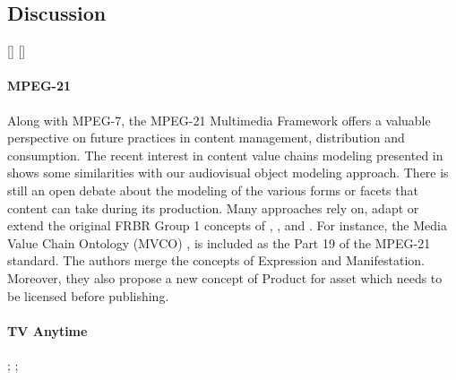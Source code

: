 \subsection{Discussion}
[]
[]

\paragraph{MPEG-21}
Along with MPEG-7, the MPEG-21 Multimedia Framework \cite{Burnett2003} offers a valuable perspective on future practices in content management, distribution and consumption. The recent interest in content value chains modeling presented in \cite{Garcia2010} shows some similarities with our audiovisual object modeling approach. There is still an open debate about the modeling of the various forms or facets that content can take during its production. Many approaches rely on, adapt or extend the original FRBR Group 1 concepts of , ,  and . 
For instance, the Media Value Chain Ontology (MVCO) \cite{Rodriguez-Doncel2009}, \cite{Rodriguez-Doncel2010} is included as the Part 19 of the MPEG-21 standard. 
The authors merge the concepts of Expression and Manifestation. Moreover, they also propose a new concept of Product for asset which needs to be licensed before publishing. 




\paragraph{TV Anytime}
\cite{Evain2000} ; \cite{Tsinaraki2004} ; \cite{Tsinaraki2005}

